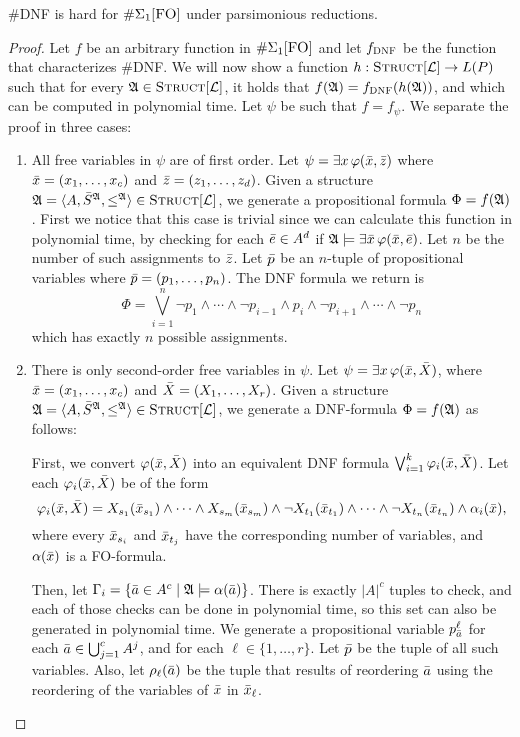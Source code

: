 \begin{theo}
	{\sc \#DNF} is hard for $\E1$ under parsimonious reductions. 
\end{theo}
\begin{proof}
	Let $f$ be an arbitrary function in $\E1$ and let $f_{\textsc{DNF}}$ be the function that characterizes {\sc \#DNF}. We will now show a function $h:\textsc{Struct}[{\cal L}]\to L(P)$ such that for every ${\frak A}\in\textsc{Struct}[{\cal L}]$, it holds that $f({\frak A}) = f_{\textsc{DNF}}(h({\frak A}))$, and which can be computed in polynomial time. Let $\psi$ be such that $f = f_{\psi}$. We separate the proof in three cases:
	\begin{enumerate}
		\item All free variables in $\psi$ are of first order. Let $\psi = \exists x\,\varphi(\bar{x},\bar{z})$ where $\bar{x} = (x_1,\ldots,x_c)$ and $\bar{z} = (z_1,\ldots,z_d)$. Given a structure ${\frak A} = \langle A, \bar{S}^{{\frak A}}, \leq^{{\frak A}} \rangle\in\textsc{Struct}[{\cal L}]$, we generate a propositional formula $\Phi = f({\frak A})$. First we notice that this case is trivial since we can calculate this function in polynomial time, by checking for each $\bar{e}\in A^d$ if ${\frak A}\models\exists\bar{x}\,\varphi(\bar{x},\bar{e})$. Let $n$ be the number of such assignments to $\bar{z}$. Let $\bar{p}$ be an $n$-tuple of propositional variables where $\bar{p} = (p_1,\ldots,p_n)$. The DNF formula we return is
		\[
		\Phi = \bigvee_{i = 1}^n \neg p_1 \wedge \cdots \wedge \neg p_{i-1} \wedge p_i \wedge \neg p_{i+1} \wedge \cdots \wedge \neg p_n
		\]
		which has exactly $n$ possible assignments.
		\item There is only second-order free variables in $\psi$. Let $\psi = \exists x\,\varphi(\bar{x},\bar{X})$, where $\bar{x} = (x_1,\ldots,x_c)$ and $\bar{X} = (X_1,\ldots,X_r)$. Given a structure ${\frak A} = \langle A, \bar{S}^{{\frak A}}, \leq^{{\frak A}} \rangle\in\textsc{Struct}[{\cal L}]$, we generate a DNF-formula $\Phi = f({\frak A})$ as follows:
		
		First, we convert $\varphi(\bar{x},\bar{X})$ into an equivalent DNF formula $\bigvee_{i = 1}^k \varphi_{i}(\bar{x},\bar{X})$. Let each $\varphi_{i}(\bar{x},\bar{X})$ be of the form
		\[
		\varphi_{i}(\bar{x},\bar{X}) = X_{s_1}(\bar{x}_{s_1}) \wedge \cdots \wedge X_{s_m}(\bar{x}_{s_m}) \wedge \neg X_{t_1}(\bar{x}_{t_1}) \wedge \cdots \wedge \neg X_{t_n}(\bar{x}_{t_n}) \wedge \alpha_i(\bar{x}),
		\]
		where every $\bar{x}_{s_i}$ and $\bar{x}_{t_j}$ have the corresponding number of variables, and $\alpha(\bar{x})$ is a FO-formula.
		
		Then, let $\Gamma_i = \{\bar{a}\in A^c\mid {\frak A}\models\alpha(\bar{a})\}$. There is exactly $\vert A \vert^c$ tuples to check, and each of those checks can be done in polynomial time, so this set can also be generated in polynomial time. We generate a propositional variable $p^{\ell}_{\bar{a}}$ for each $\bar{a}\in \bigcup_{j = 1}^c A^j$, and for each $\ell\in\{1,\ldots,r\}$. Let $\bar{p}$ be the tuple of all such variables. Also, let $\rho_{\ell}(\bar{a})$ be the tuple that results of reordering $\bar{a}$ using the reordering of the variables of $\bar{x}$ in $\bar{x}_{\ell}$.
		

\end{enumerate}
\end{proof}
